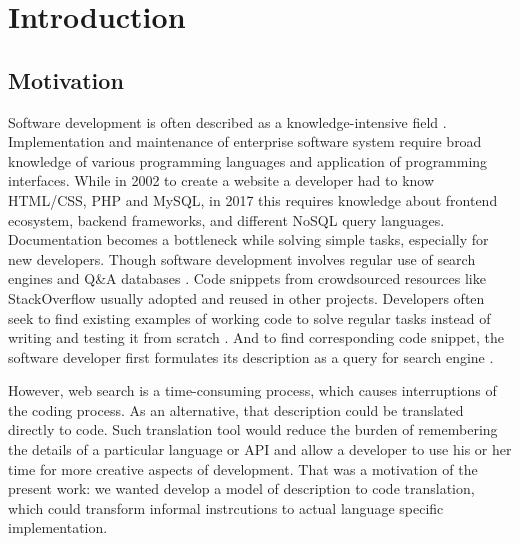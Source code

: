 \chapter{Introduction}
\label{Chapter1}

\newcommand{\keyword}[1]{\textbf{#1}}
\newcommand{\tabhead}[1]{\textbf{#1}}

\section{Motivation}
Software development is often described as a knowledge-intensive field \parencite{Robillard1999}. Implementation and maintenance of enterprise software system require broad knowledge of various programming languages and application of programming interfaces. While in 2002 to create a website a developer had to know HTML/CSS, PHP and MySQL, in 2017 this requires knowledge about frontend ecosystem, backend frameworks, and different NoSQL query languages. Documentation becomes a bottleneck while solving simple tasks, especially for new developers. Though software development involves regular use of search engines and Q\&A databases \parencite{Treude2011}. Code snippets from crowdsourced resources like StackOverflow usually adopted and reused in other projects. Developers often seek to find existing examples of working code to solve regular tasks instead of writing and testing it from scratch \parencite{Brandt2010}. And to find corresponding code snippet, the software developer first formulates its description as a query for search engine \parencite{Brandt2009}. 

However, web search is a time-consuming process, which causes interruptions of the coding process. As an alternative, that description could be translated directly to code. Such translation tool would reduce the burden of remembering the details of a particular language or API and allow a developer to use his or her time for more creative aspects of development. That was a motivation of the present work: we wanted develop a model of description to code translation, which could transform informal instrcutions to actual language specific implementation.




